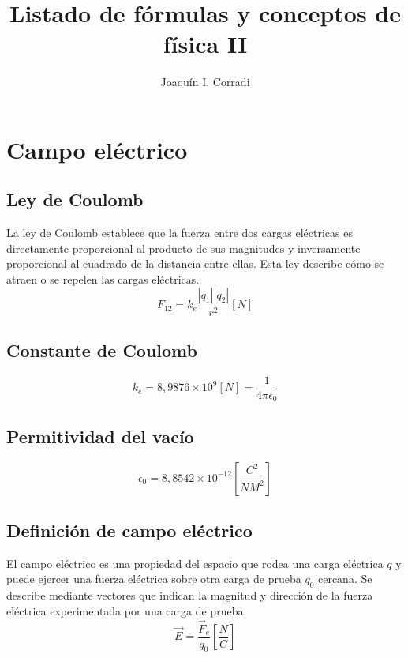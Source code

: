 \documentclass{report}
\title{Listado de fórmulas y conceptos de física II}
\date{}
\author{Joaquín I. Corradi}
\begin{document}
  \maketitle
  \setcounter{tocdepth}{5}
  \tableofcontents
  \newpage

  \section*{Campo eléctrico}

    \subsection*{Ley de Coulomb}
      La ley de Coulomb establece que la fuerza entre dos cargas eléctricas es directamente 
      proporcional al producto de sus magnitudes y inversamente proporcional al cuadrado de 
      la distancia entre ellas. Esta ley describe cómo se atraen o se repelen las cargas eléctricas.
      \begin{equation*}
        F_{12}=k_e\frac{|q_1||q_2|}{r^2}[N]
      \end{equation*}

    \subsection*{Constante de Coulomb}
      \begin{equation*}
        k_e=8,9876\times10^9[N]=\frac{1}{4\pi\epsilon_0}
      \end{equation*}

    \subsection*{Permitividad del vacío}
      \begin{equation*}
        \epsilon_0=8,8542\times10^{-12}\left[\frac{C^2}{NM^2}\right]
      \end{equation*}

    \subsection*{Definición de campo eléctrico}
      El campo eléctrico es una propiedad del espacio que rodea una carga eléctrica $q$ y puede ejercer una 
      fuerza eléctrica sobre otra carga de prueba $q_0$ cercana. Se describe mediante vectores que indican la 
      magnitud y dirección de la fuerza eléctrica experimentada por una carga de prueba.
      \begin{equation*}
        \overrightarrow{E}=\frac{\overrightarrow{F}_e}{q_0}\left[\frac{N}{C}\right]
      \end{equation*}
\end{document}
